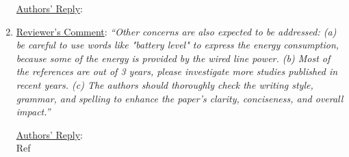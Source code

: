 \documentclass[12pt,draftclsnofoot,onecolumn]{IEEEtran}
\begin{document}
\begin{enumerate}
\underline{Authors' Reply}:\\

\item \underline{Reviewer's Comment}: 
\textit{``Other concerns are also expected to be addressed: (a) be careful to use words like "battery level" to express the energy consumption, because some of the energy is provided by the wired line power. (b) Most of the references are out of 3 years, please investigate more studies published in recent years. (c) The authors should thoroughly check the writing style, grammar, and spelling to enhance the paper's clarity, conciseness, and overall impact.''} \newline

\underline{Authors' Reply}:\\

Ref

\end{enumerate}


\newpage
\end{document}
